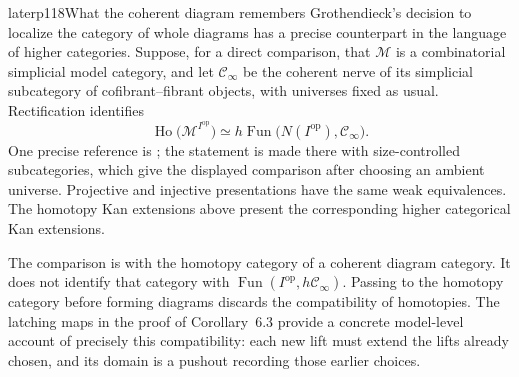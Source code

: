 \begin{dcomment}{later}{p118}{What the coherent diagram remembers}
Grothendieck's decision to localize the category of whole diagrams has a precise counterpart in the language of higher categories. Suppose, for a direct comparison, that $\mathcal M$ is a combinatorial simplicial model category, and let $\mathcal C_\infty$ be the coherent nerve of its simplicial subcategory of cofibrant--fibrant objects, with universes fixed as usual. Rectification identifies
\[
 \operatorname{Ho}\bigl(\mathcal M^{I^{\mathrm{op}}}\bigr)
 \simeq h\operatorname{Fun}\bigl(N(I^{\mathrm{op}}),\mathcal C_\infty\bigr).
\]
One precise reference is \citet[Proposition~4.2.4.4, Remark~4.2.4.5, and Corollary~4.2.4.8]{Lurie2009HTT}; the statement is made there with size-controlled subcategories, which give the displayed comparison after choosing an ambient universe. Projective and injective presentations have the same weak equivalences. The homotopy Kan extensions above present the corresponding higher categorical Kan extensions.

The comparison is with the homotopy category of a coherent diagram category. It does not identify that category with $\operatorname{Fun}(I^{\mathrm{op}},h\mathcal C_\infty)$. Passing to the homotopy category before forming diagrams discards the compatibility of homotopies. The latching maps in the proof of Corollary~6.3 provide a concrete model-level account of precisely this compatibility: each new lift must extend the lifts already chosen, and its domain is a pushout recording those earlier choices.
\end{dcomment}
